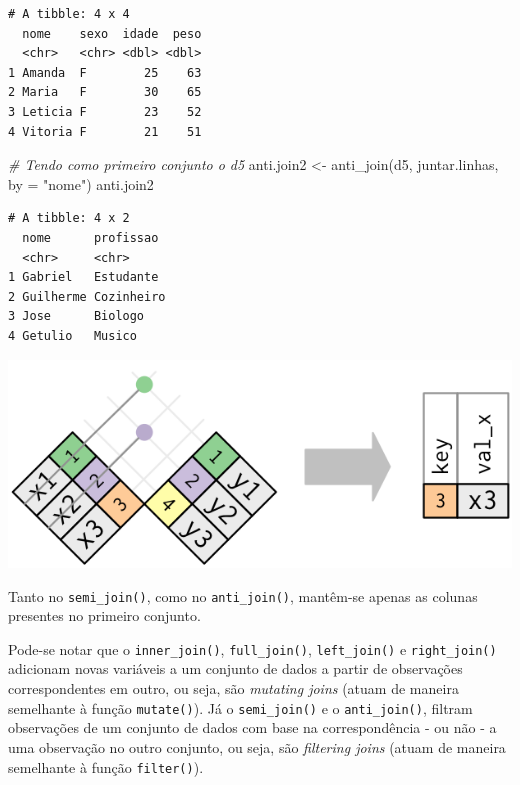 \documentclass[
  brazilian,
]{book}
\newenvironment{Shaded}{\begin{snugshade}}{\end{snugshade}}
\newcommand{\AttributeTok}[1]{\textcolor[rgb]{0.77,0.63,0.00}{#1}}
\newcommand{\CommentTok}[1]{\textcolor[rgb]{0.56,0.35,0.01}{\textit{#1}}}
\newcommand{\FunctionTok}[1]{\textcolor[rgb]{0.00,0.00,0.00}{#1}}
\newcommand{\NormalTok}[1]{#1}
\newcommand{\OtherTok}[1]{\textcolor[rgb]{0.56,0.35,0.01}{#1}}
\newcommand{\StringTok}[1]{\textcolor[rgb]{0.31,0.60,0.02}{#1}}
\let\origfigure\figure
\let\endorigfigure\endfigure
\renewenvironment{figure}[1][2] {
    \expandafter\origfigure\expandafter[H]
} {
    \endorigfigure
}
\begin{document}
\begin{verbatim}
# A tibble: 4 x 4
  nome    sexo  idade  peso
  <chr>   <chr> <dbl> <dbl>
1 Amanda  F        25    63
2 Maria   F        30    65
3 Leticia F        23    52
4 Vitoria F        21    51
\end{verbatim}

\begin{Shaded}
\begin{Highlighting}[]
\CommentTok{\# Tendo como primeiro conjunto o \textasciigrave{}d5\textasciigrave{}}
\NormalTok{anti.join2 }\OtherTok{\textless{}{-}} \FunctionTok{anti\_join}\NormalTok{(d5, juntar.linhas, }\AttributeTok{by =} \StringTok{"nome"}\NormalTok{)}
\NormalTok{anti.join2}
\end{Highlighting}
\end{Shaded}

\begin{verbatim}
# A tibble: 4 x 2
  nome      profissao 
  <chr>     <chr>     
1 Gabriel   Estudante 
2 Guilherme Cozinheiro
3 Jose      Biologo   
4 Getulio   Musico    
\end{verbatim}

\begin{figure}

{\centering \includegraphics[width=0.5\linewidth]{imagens/join-anti} 

}

\caption{Esquematização da função anti-join. Fonte: R for Data Science, 2017.}\label{fig:unnamed-chunk-181}
\end{figure}

Tanto no \texttt{semi\_join()}, como no \texttt{anti\_join()}, mantêm-se apenas as colunas presentes no primeiro conjunto.

Pode-se notar que o \texttt{inner\_join()}, \texttt{full\_join()}, \texttt{left\_join()} e \texttt{right\_join()} adicionam novas variáveis a um conjunto de dados a partir de observações correspondentes em outro, ou seja, são \emph{mutating joins} (atuam de maneira semelhante à função \texttt{mutate()}). Já o \texttt{semi\_join()} e o \texttt{anti\_join()}, filtram observações de um conjunto de dados com base na correspondência - ou não - a uma observação no outro conjunto, ou seja, são \emph{filtering joins} (atuam de maneira semelhante à função \texttt{filter()}).
\end{document}

